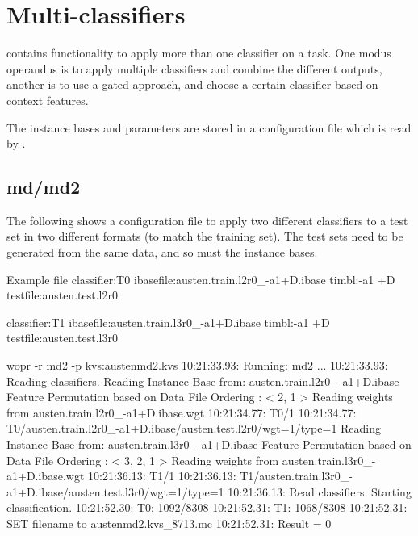 \documentclass[a4paper,10pt,twoside]{report}
\begin{document}
\section{Multi-classifiers}

\Wopr{} contains functionality to apply more than one classifier on a
task. One modus operandus is to apply multiple classifiers and combine
the different outputs, another is to use a gated approach, and choose
a certain classifier based on context features.

The instance bases and parameters are stored in a configuration file
which is read by \wopr{}.

\subsection{md/md2} %


The following shows a configuration file to apply two different
classifiers to a test set in two different formats (to match the
training set). The test sets need to be generated from the same data,
and so must the instance bases.

\begin{wout}{Example  file}%
classifier:T0
ibasefile:austen.train.l2r0_-a1+D.ibase
timbl:-a1 +D
testfile:austen.test.l2r0

classifier:T1
ibasefile:austen.train.l3r0_-a1+D.ibase
timbl:-a1 +D
testfile:austen.test.l3r0
\end{wout}

\begin{bash}{}
wopr -r md2 -p kvs:austenmd2.kvs
10:21:33.93: Running: md2
...
10:21:33.93: Reading classifiers.
Reading Instance-Base from: austen.train.l2r0_-a1+D.ibase
Feature Permutation based on Data File Ordering :
< 2, 1 >
Reading weights from austen.train.l2r0_-a1+D.ibase.wgt
10:21:34.77: T0/1
10:21:34.77: T0/austen.train.l2r0_-a1+D.ibase/austen.test.l2r0/wgt=1/type=1
Reading Instance-Base from: austen.train.l3r0_-a1+D.ibase
Feature Permutation based on Data File Ordering :
< 3, 2, 1 >
Reading weights from austen.train.l3r0_-a1+D.ibase.wgt
10:21:36.13: T1/1
10:21:36.13: T1/austen.train.l3r0_-a1+D.ibase/austen.test.l3r0/wgt=1/type=1
10:21:36.13: Read classifiers. Starting classification.
10:21:52.30: T0: 1092/8308
10:21:52.31: T1: 1068/8308
10:21:52.31: SET filename to austenmd2.kvs_8713.mc
10:21:52.31: Result = 0
\end{bash}
\end{document}

